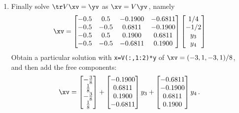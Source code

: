 \begin{example}
\begin{solution}
\begin{enumerate}
\item Finally solve \(\tr V\xv=\yv\) as \(\xv=V\yv\)\,, namely
\begin{equation*}
\xv=\begin{bmatrix} -0.5&0.5&-0.1900&-0.6811
\\-0.5&-0.5&0.6811&-0.1900
\\-0.5&0.5&0.1900&0.6811
\\-0.5&-0.5&-0.6811&0.1900 \end{bmatrix}
\begin{bmatrix} 1/4\\-1/2\\y_3\\y_4 \end{bmatrix}
\end{equation*}
Obtain a particular solution with \verb|x=V(:,1:2)*y| of \(\xv=(-3,1,-3,1)/8\), and then add the free components:
\begin{equation*}
\xv=\begin{bmatrix} -\frac38\\\frac18\\-\frac38\\\frac18 \end{bmatrix}
+\begin{bmatrix}-0.1900
\\0.6811
\\0.1900
\\-0.6811 \end{bmatrix}y_3
+\begin{bmatrix} -0.6811
\\-0.1900
\\0.6811
\\0.1900 \end{bmatrix}y_4\,.
\end{equation*}

\end{enumerate}
\end{solution}
\end{example}






